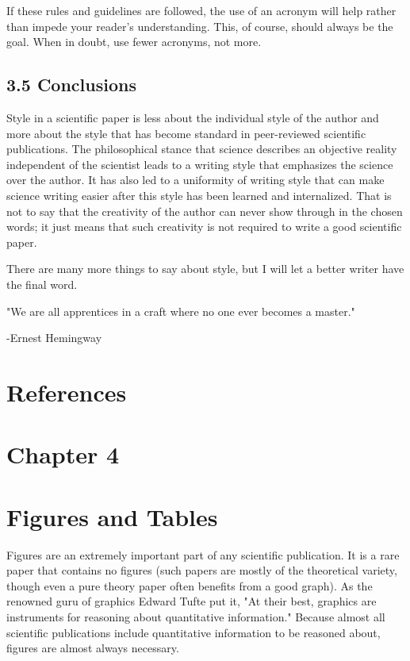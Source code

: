 If these rules and guidelines are followed, the use of an acronym will help rather than impede your reader's understanding. This, of course, should always be the goal. When in doubt, use fewer acronyms, not more.

\subsection*{3.5 Conclusions}
Style in a scientific paper is less about the individual style of the author and more about the style that has become standard in peer-reviewed scientific publications. The philosophical stance that science describes an objective reality independent of the scientist leads to a writing style that emphasizes the science over the author. It has also led to a uniformity of writing style that can make science writing easier after this style has been learned and internalized. That is not to say that the creativity of the author can never show through in the chosen words; it just means that such creativity is not required to write a good scientific paper.

There are many more things to say about style, but I will let a better writer have the final word.

"We are all apprentices in a craft where no one ever becomes a master."

-Ernest Hemingway

\section*{References}
\section*{Chapter 4}
\section*{Figures and Tables}
Figures are an extremely important part of any scientific publication. It is a rare paper that contains no figures (such papers are mostly of the theoretical variety, though even a pure theory paper often benefits from a good graph). As the renowned guru of graphics Edward Tufte put it, "At their best, graphics are instruments for reasoning about quantitative information." Because almost all scientific publications include quantitative information to be reasoned about, figures are almost always necessary.

